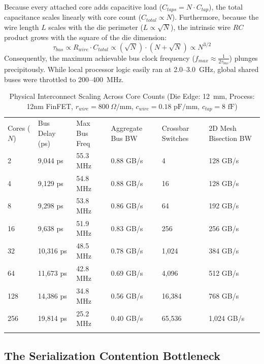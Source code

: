 Because every attached core adds capacitive load ($C_{taps} = N \cdot C_{tap}$), the total capacitance scales linearly with core count ($C_{total} \propto N$). Furthermore, because the wire length $L$ scales with the die perimeter ($L \propto \sqrt{N}$), the intrinsic wire $RC$ product grows with the square of the die dimension:
\begin{equation}
\tau_{bus} \propto R_{wire} \cdot C_{total} \propto (\sqrt{N}) \cdot (N + \sqrt{N}) \propto N^{3/2}
\label{eq:bus_scaling}
\end{equation}
Consequently, the maximum achievable bus clock frequency ($f_{max} \approx \frac{1}{2 \tau_{bus}}$) plunges precipitously. While local processor logic easily ran at 2.0--3.0~GHz, global shared buses were throttled to 200--400~MHz.

\begin{table}[t]
\caption{Physical Interconnect Scaling Across Core Counts (Die Edge: 12~mm, Process: 12nm FinFET, $r_{wire}=800\ \Omega/\text{mm}$, $c_{wire}=0.18\text{ pF/mm}$, $c_{tap}=8\text{ fF}$)}
\label{tab:bus_vs_noc}
\begin{tabular}{p{1.2cm}p{2.2cm}p{2.0cm}p{2.0cm}p{2.0cm}p{2.2cm}}
\hline\noalign{\smallskip}
Cores ($N$) & Bus Delay (ps) & Max Bus Freq & Aggregate Bus BW & Crossbar Switches & 2D Mesh Bisection BW \\
\noalign{\smallskip}\svhline\noalign{\smallskip}
2   & 9,044 ps  & 55.3 MHz & 0.88 GB/s & 4      & 128 GB/s \\
4   & 9,129 ps  & 54.8 MHz & 0.88 GB/s & 16     & 128 GB/s \\
8   & 9,298 ps  & 53.8 MHz & 0.86 GB/s & 64     & 192 GB/s \\
16  & 9,638 ps  & 51.9 MHz & 0.83 GB/s & 256    & 256 GB/s \\
32  & 10,316 ps & 48.5 MHz & 0.78 GB/s & 1,024  & 384 GB/s \\
64  & 11,673 ps & 42.8 MHz & 0.69 GB/s & 4,096  & 512 GB/s \\
128 & 14,386 ps & 34.8 MHz & 0.56 GB/s & 16,384 & 768 GB/s \\
256 & 19,814 ps & 25.2 MHz & 0.40 GB/s & 65,536 & 1,024 GB/s \\
\noalign{\smallskip}\hline\noalign{\smallskip}
\end{tabular}
\end{table}

\subsection{The Serialization Contention Bottleneck}
\label{subsec:ch1_serialization}

